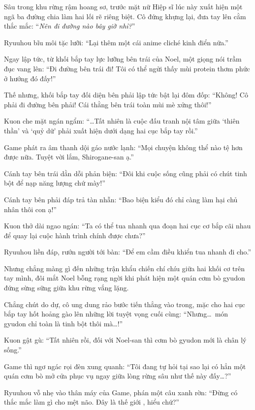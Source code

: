\documentclass[../main.tex]{subfiles}
\begin{document}
Sâu trong khu rừng rậm hoang sơ, trước mặt nữ Hiệp sĩ lúc này xuất hiện một ngã ba đường chia làm hai lối rẽ riêng biệt. Cô đứng khựng lại, đưa tay lên cằm thắc mắc: ``\textit{Nên đi đường nào bây giờ nhỉ?}''


Ryuuhou bĩu môi tặc lưỡi: ``Lại thêm một cái anime cliché kinh điển nữa.''

Ngay lập tức, từ khối bắp tay lực lưỡng bên trái của Noel, một giọng nói trầm đục vang lên: ``Đi đường bên trái đi! Tôi có thể ngửi thấy mùi protein thơm phức ở hướng đó đấy!''

Thế nhưng, khối bắp tay đối diện bên phải lập tức bật lại đôm đốp: ``Không! Cô phải đi đường bên phải! Cái thằng bên trái toàn mùi mè xửng thôi!''

Kuon che mặt ngán ngẩm: ``\dots Tất nhiên là cuộc đấu tranh nội tâm giữa `thiên thần' và `quỷ dữ' phải xuất hiện dưới dạng hai cục bắp tay rồi.''

Game phát ra âm thanh dội gáo nước lạnh: ``Mọi chuyện không thể nào tệ hơn được nữa. Tuyệt vời lắm, Shirogane-san ạ.''

Cánh tay bên trái dằn dỗi phản biện: ``Đôi khi cuộc sống cũng phải có chút tinh bột để nạp năng lượng chứ mày!''

Cánh tay bên phải đáp trả tàn nhẫn: ``Bao biện kiểu đó chỉ càng làm hại chủ nhân thôi con ạ!''

Kuon thở dài ngao ngán: ``Ta có thể tua nhanh qua đoạn hai cục cơ bắp cãi nhau để quay lại cuộc hành trình chính được chưa?''

Ryuuhou liền đáp, rướn người tới bàn: ``Để em cầm điều khiển tua nhanh đi cho.''

Nhưng chẳng màng gì đến những trận khẩu chiến chí chíu giữa hai khối cơ trên tay mình, đôi mắt Noel bỗng rạng ngời khi phát hiện một quán cơm bò gyudon đứng sừng sững giữa khu rừng vắng lặng.


Chẳng chút do dự, cô ung dung rảo bước tiến thẳng vào trong, mặc cho hai cục bắp tay hốt hoảng gào lên những lời tuyệt vọng cuối cùng: ``Nhưng\dots\ món gyudon chỉ toàn là tinh bột thôi mà\dots!''

Kuon gật gù: ``Tất nhiên rồi, đối với Noel-san thì cơm bò gyudon mới là chân lý sống.''

Game thì ngơ ngác rọi đèn xung quanh: ``Tôi đang tự hỏi tại sao lại có hẳn một quán cơm bò mở cửa phục vụ ngay giữa lòng rừng sâu như thế này đấy\dots?''

Ryuuhou vỗ nhẹ vào thân máy của Game, phán một câu xanh rờn: ``Đừng có thắc mắc làm gì cho mệt não. Đây là thế giới \hll, hiểu chứ?''
\end{document}
